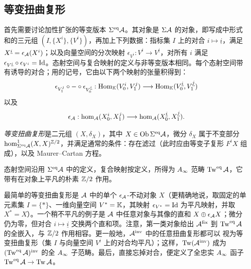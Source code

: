 \subsection{等变扭曲复形}\label{sec:6b}
首先需要讨论加性扩张的等变版本 $\Sigma^{\mathrm{eq}}\mathcal A$。其对象是 $\Sigma\mathcal A$ 的对象，即写成中形式和的三元组 $(I,\{X^i\},\{V^i\})$，再加上下列数据：指标集 $I$ 上的对合 $i\mapsto\underline i$，满足 $X^{\underline i}=\epsilon_{\mathcal A}(X^i)$；以及向量空间的分次映射 $\epsilon_{V^i}:V^i\to V^{\underline i}$，对所有 $i$ 满足 $\epsilon_{V^{\underline i}}\circ\epsilon_{V^i}=\operatorname{Id}$。态射空间与复合映射的定义与非等变版本相同。每个态射空间带有诱导的对合；用的记号，它由以下两个映射的张量积得到：
\[
\epsilon_{V_1^j}\circ-\circ\epsilon_{V_0^{\underline i}}:
\operatorname{Hom}_{\mathbb K}(V_0^i,V_1^j)\longrightarrow\operatorname{Hom}_{\mathbb K}(V_0^{\underline i},V_1^{\underline j})
\]
以及
\[
\epsilon_{\mathcal A}:\hom_{\mathcal A}(X_0^i,X_1^j)\longrightarrow\hom_{\mathcal A}(X_0^{\underline i},X_1^{\underline j}).
\]
\begin{definition*}
\emph{等变扭曲复形}是二元组 $(X,\delta_X)$，其中 $X\in\operatorname{Ob}\Sigma^{\mathrm{eq}}\mathcal A$，微分 $\delta_X$ 属于不变部分 $\hom^1_{\Sigma^{\mathrm{eq}}\mathcal A}(X,X)^{\mathbb Z/2}$，并满足通常的条件：存在滤过（此时应由等变子复形 $F^iX$ 组成），以及 Maurer–Cartan 方程。
\end{definition*}
态射空间沿用 $\Sigma^{\mathrm{eq}}\mathcal A$ 中的定义，复合映射按定义，所得为 $A_\infty$ 范畴 $\operatorname{Tw}^{\mathrm{eq}}\mathcal A$，它带有在对象上平凡的朴素 $\mathbb Z/2$ 作用。

最简单的等变扭曲复形是 $\mathcal A$ 中的单个 $\epsilon_{\mathcal A}$-不动对象 $X$（更精确地说，取固定的单元素集 $I=\{*\}$、一维向量空间 $V^*=\mathbb K$，其映射 $\epsilon_{V^*}=\operatorname{Id}$ 为平凡映射，并取 $X^*=X$）。一个稍不平凡的例子是 $\mathcal A$ 中任意对象与其像的直和 $X\oplus\epsilon_{\mathcal A}X$；微分仍为零，但对合 $i\mapsto\underline i$ 交换两个直和项。注意，第一类对象给出 $\mathcal A^{\mathrm{fix}}$ 到 $\operatorname{Tw}^{\mathrm{eq}}\mathcal A$ 的全嵌入，与 $\mathbb Z/2$ 作用相容。更一般地，$\mathcal A^{\mathrm{inv}}$ 中的任意扭曲复形都可以
视为等变扭曲复形（集 $I$ 与向量空间 $V^i$ 上的对合均平凡）；这样，$\operatorname{Tw}(\mathcal A^{\mathrm{inv}})$ 成为 $(\operatorname{Tw}^{\mathrm{eq}}\mathcal A)^{\mathrm{inv}}$ 的全 $A_\infty$ 子范畴。最后，直接忘掉对合，便定义了全忠实 $A_\infty$ 函子 $\operatorname{Tw}^{\mathrm{eq}}\mathcal A\to\operatorname{Tw}\mathcal A$。

